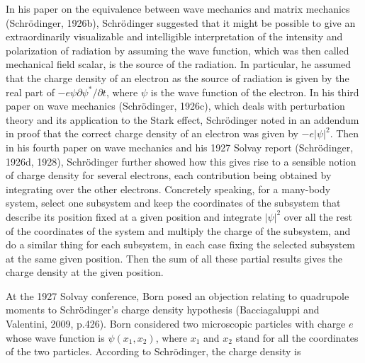 In his paper on the equivalence between wave mechanics and matrix mechanics (Schr\"{o}dinger, 1926b), Schr\"{o}dinger suggested that it might be possible to give an extraordinarily visualizable and intelligible interpretation of the intensity and polarization of radiation by assuming the wave function, which was then called mechanical field scalar, is the source of the radiation. In particular, he assumed that the charge density of an electron as the source of radiation is given by the real part of $-e\psi \partial\psi^*/\partial t$, where $\psi$ is the wave function of the electron. In his third paper on wave mechanics (Schr\"{o}dinger, 1926c), which deals with perturbation theory and its application to the Stark effect, Schr\"{o}dinger noted in an addendum in proof that the correct charge density of an electron was given by $-e|\psi|^2$. Then in his fourth paper on wave mechanics and his 1927 Solvay report (Schr\"{o}dinger, 1926d, 1928), Schr\"{o}dinger further showed how this gives rise to a sensible notion of charge density for several electrons, each contribution being obtained by integrating over the other electrons. Concretely speaking, for a many-body system, select one subsystem and keep the coordinates of the subsystem that describe its position fixed at a given position and integrate $|\psi|^2$ over all the rest of the coordinates of the system and multiply the charge of the subsystem, and do a similar thing for each subsystem, in each case fixing the selected subsystem at the same given position. Then the sum of all these partial results gives the charge density at the given position. 

At the 1927 Solvay conference, Born posed an objection relating to quadrupole moments to Schr\"{o}dinger's charge density hypothesis (Bacciagaluppi and Valentini, 2009, p.426). Born considered two microscopic particles with charge $e$ whose wave function is $\psi(x_1,x_2)$, where $x_1$ and $x_2$ stand for all the coordinates of the two particles. According to Schr\"{o}dinger, the charge density is

